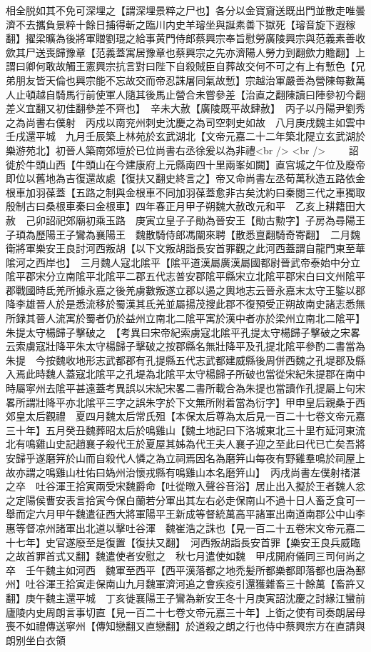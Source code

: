 相全脱如其不免可深埋之【謂深埋景粹之尸也】各分以金寶齎送既出門並散走唯曇濟不去攜負景粹十餘日捕得斬之臨川内史羊璿坐與誕素善下獄死【璿音旋下遐稼翻】擢梁曠為後將軍贈劉琨之給事黄門侍郎蔡興宗奉旨慰勞廣陵興宗與范義素善收歛其尸送喪歸豫章【范義蓋寓居豫章也蔡興宗之先亦濟陽人勞力到翻歛力贍翻】上謂曰卿何敢故觸王憲興宗抗言對曰陛下自殺賊臣自葬故交何不可之有上有慙色【兄弟朋友皆天倫也興宗能不忘故交而帝忍誅屠同氣故慙】宗越治軍嚴善為營陳每數萬人止頓越自騎馬行前使軍人隨其後馬止營合未嘗參差【治直之翻陳讀曰陣參初今翻差义宜翻又初佳翻參差不齊也】　辛未大赦【廣陵既平故肆赦】　丙子以丹陽尹劉秀之為尚書右僕射　丙戍以南兖州刺史沈慶之為司空刺史如故　八月庚戌魏主如雲中壬戌還平城　九月壬辰築上林苑於玄武湖北【文帝元嘉二十二年築北隄立玄武湖於樂游苑北】初晉人築南郊壇於已位尚書右丞徐爰以為非禮<br />
<br />
　　詔徙於牛頭山西【牛頭山在今建康府上元縣南四十里兩峯如闕】直宫城之午位及廢帝即位以舊地為吉復還故處【復扶又翻史終言之】帝又命尚書左丞荀萬秋造五路依金根車加羽葆蓋【五路之制與金根車不同加羽葆蓋愈非古矣沈約曰秦閱三代之車獨取殷制古曰桑根車秦曰金根車】四年春正月甲子朔魏大赦改元和平　乙亥上耕籍田大赦　己卯詔祀郊廟初乘玉路　庚寅立皇子子勛為晉安王【勛古勲字】子房為尋陽王子頊為歷陽王子鸞為襄陽王　魏散騎侍郎馮闡來聘【散悉亶翻騎奇寄翻】　二月魏衛將軍樂安王良討河西叛胡【以下文叛胡詣長安首罪觀之此河西蓋謂自龍門東至華隂河之西岸也】　三月魏人寇北隂平【隂平道漢屬廣漢屬國都尉晉武帝泰始中分立隂平郡宋分立南隂平北隂平二郡五代志普安郡隂平縣宋立北隂平郡宋白曰文州隂平郡戰國時氐羌所據永嘉之後羌虜數叛遂立郡以遏之輿地志云晉永嘉末太守王鍳以郡降李雄晉人於是悉流移於蜀漢其氐羌並屬揚茂搜此郡不復預受正朔故南史諸志悉無所録其晉人流寓於蜀者仍於益州立南北二隂平寓於漢中者亦於梁州立南北二隂平】朱提太守楊歸子擊破之　【考異曰宋帝紀索虜寇北隂平孔提太守楊歸子擊破之宋畧云索虜寇壯降平朱太守楊歸子擊破之按郡縣名無壯降平及孔提北隂平參酌二書當為朱提　今按魏收地形志武都郡有孔提縣五代志武都建威縣後周併西魏之孔堤郡及縣入焉此時魏人蓋寇北隂平之孔堤為北隂平太守楊歸子所破也當從宋紀朱提郡在南中時屬寜州去隂平甚遠蓋考異誤以宋紀宋畧二書所載合為朱提也當讀作孔提屬上句宋畧所謂壯降平亦北隂平三字之誤朱字於下文無所附着當為衍字】甲申皇后親桑于西郊皇太后觀禮　夏四月魏太后常氏殂【本保太后尊為太后見一百二十七卷文帝元嘉三十年】五月癸丑魏葬昭太后於鳴雞山【魏土地記曰下洛城東北三十里冇延河東流北有鳴雞山史記趙襄子殺代王於夏屋其姊為代王夫人襄子迎之至此曰代已亡矣吾將安歸乎遂磨笄於山而自殺代人憐之為立祠焉因名為磨笄山每夜有野雞羣鳴於祠屋上故亦謂之鳴雞山杜佑曰媯州治懷戎縣有鳴雞山本名磨笄山】　丙戌尚書左僕射禇湛之卒　吐谷渾王拾寅兩受宋魏爵命【吐從暾入聲谷音浴】居止出入擬於王者魏人忿之定陽侯曹安表言拾寅今保白蘭若分軍出其左右必走保南山不過十日人畜乏食可一舉而定六月甲午魏遣征西大將軍陽平王新成等督統萬高平諸軍出南道南郡公中山李惠等督凉州諸軍出北道以擊吐谷渾　魏崔浩之誅也【見一百二十五卷宋文帝元嘉二十七年】史官遂廢至是復置【復扶又翻】　河西叛胡詣長安首罪【樂安王良兵威臨之故首罪首式又翻】魏遣使者安慰之　秋七月遣使如魏　甲戌開府儀同三司何尚之卒　壬午魏主如河西　魏軍至西平【西平漢落都之地禿髪所都樂都即落都也唐為鄯州】吐谷渾王拾寅走保南山九月魏軍濟河追之會疾疫引還獲雜畜三十餘萬【畜許又翻】庚午魏主還平城　丁亥徙襄陽王子鸞為新安王冬十月庚寅詔沈慶之討緣江蠻前廬陵内史周朗言事切直【見一百二十七卷文帝元嘉三十年】上衘之使有司奏朗居母喪不如禮傳送寧州【傳知戀翻又直戀翻】於道殺之朗之行也侍中蔡興宗方在直請與朗别坐白衣領